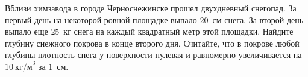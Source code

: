 	Вблизи химзавода в городе Черноснежинске прошел двухдневный снегопад. За первый день на некоторой ровной площадке выпало $20$~см снега. За второй день выпало еще $25$~кг снега на каждый квадратный метр этой площадки. Найдите глубину снежного покрова в конце второго дня. Считайте, что в покрове любой глубины плотность снега у поверхности нулевая и равномерно увеличивается на $10~\text{кг/м}^3$ за $1$~см.